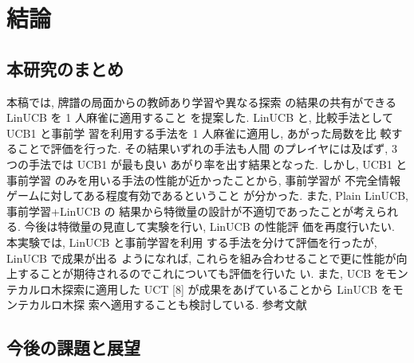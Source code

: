 \chapter{結論}
\label{chap:conclusion}
\section{本研究のまとめ}

本稿では, 牌譜の局面からの教師あり学習や異なる探索 の結果の共有ができる LinUCB を 1 人麻雀に適用すること を提案した. LinUCB と, 比較手法として UCB1 と事前学 習を利用する手法を 1 人麻雀に適用し, あがった局数を比 較することで評価を行った. その結果いずれの手法も人間 のプレイヤには及ばず, 3 つの手法では UCB1 が最も良い あがり率を出す結果となった. しかし, UCB1 と事前学習 のみを用いる手法の性能が近かったことから, 事前学習が 不完全情報ゲームに対してある程度有効であるということ が分かった. また, Plain LinUCB, 事前学習+LinUCB の 結果から特徴量の設計が不適切であったことが考えられる.
今後は特徴量の見直して実験を行い, LinUCB の性能評 価を再度行いたい. 本実験では, LinUCB と事前学習を利用 する手法を分けて評価を行ったが, LinUCB で成果が出る ようになれば, これらを組み合わせることで更に性能が向 上することが期待されるのでこれについても評価を行いた い. また, UCB をモンテカルロ木探索に適用した UCT [8] が成果をあげていることから LinUCB をモンテカルロ木探 索へ適用することも検討している.
参考文献
\section{今後の課題と展望}